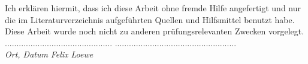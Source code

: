 \documentclass[a4paper,ngerman,oneside,titlepage,bibliography=totoc,11pt]{scrreprt}
\begin{document}
Ich erklären hiermit, dass ich diese Arbeit ohne fremde Hilfe angefertigt und nur die im Literaturverzeichnis aufgeführten Quellen und Hilfsmittel benutzt habe. Diese Arbeit wurde noch nicht zu anderen prüfungsrelevanten Zwecken vorgelegt.\\[1.5cm]

\noindent ..............................................
\qquad\qquad\qquad\qquad\qquad
....................................................\\[0.5mm]
\textit{Ort, Datum}
\qquad\qquad\qquad\qquad\qquad\qquad\qquad\qquad\qquad
\textit{Felix Loewe}
\end{document}
